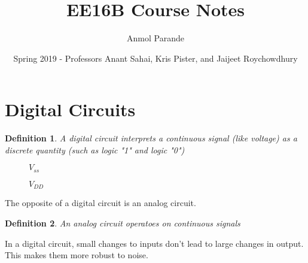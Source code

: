 \documentclass{article}
\newtheorem{definition}{Definition}
\begin{document}
\title{EE16B Course Notes}
\author{Anmol Parande}
\date{Spring 2019 - Professors Anant Sahai, Kris Pister, and Jaijeet Roychowdhury}
\maketitle
\section{Digital Circuits}
\begin{definition}
    A digital circuit interprets a continuous signal (like voltage) as a discrete quantity (such as logic "1" and logic "0")\\
    \begin{figure}[!h]
    \centering
        $V_{ss}$  $V_{DD}$
    \end{figure}
\end{definition}
The opposite of a digital circuit is an analog circuit.
\begin{definition}
    An analog circuit operatoes on continuous signals
\end{definition}
In a digital circuit, small changes to inputs don't lead to large changes in output. This makes them more robust to noise.
\end{document}
